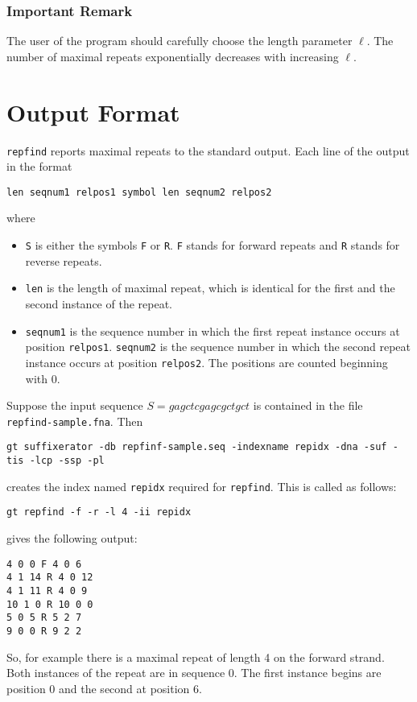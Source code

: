 \documentclass[12pt]{article}
\newcommand{\Repfind}[0]{\texttt{repfind}\xspace}
\begin{document}
\subsubsection*{Important Remark} 
The user of the program should carefully choose the length parameter \(\ell\).
The number of maximal repeats exponentially decreases with increasing
\(\ell\).

\section{Output Format}\label{Output}
\Repfind reports maximal repeats to the standard output.
Each line of the output in the format

\begin{verbatim}
len seqnum1 relpos1 symbol len seqnum2 relpos2
\end{verbatim}

where
\begin{itemize}
\item
\texttt{S} is either the symbols \texttt{F} or \texttt{R}.
\texttt{F} stands for forward repeats and \texttt{R} stands for
reverse repeats.
\item
\texttt{len} is the length of maximal repeat, which is identical for
the first and the second instance of the repeat.
\item
\texttt{seqnum1} is the sequence number in which the first repeat instance
occurs  at position \texttt{relpos1}.
\texttt{seqnum2} is the sequence number in which the second repeat instance
occurs  at position \texttt{relpos2}. The positions are counted beginning with
0.
\end{itemize}

Suppose the input sequence \(S=gagctcgagcgctgct\) 
is contained in the file \texttt{repfind-sample.fna}. Then 
\begin{footnotesize}
\begin{verbatim}
gt suffixerator -db repfinf-sample.seq -indexname repidx -dna -suf -tis -lcp -ssp -pl
\end{verbatim}
\end{footnotesize}
creates the index named \texttt{repidx} required for \Repfind. This is 
called as follows:

\begin{verbatim}
gt repfind -f -r -l 4 -ii repidx
\end{verbatim}
gives the following output:
\begin{verbatim}
4 0 0 F 4 0 6
4 1 14 R 4 0 12
4 1 11 R 4 0 9
10 1 0 R 10 0 0
5 0 5 R 5 2 7
9 0 0 R 9 2 2
\end{verbatim}
So, for example there is a maximal repeat of length 4  on the forward strand.
Both instances of the repeat are in sequence 0. The first instance begins
are position 0 and the second at position 6.
\end{document}
